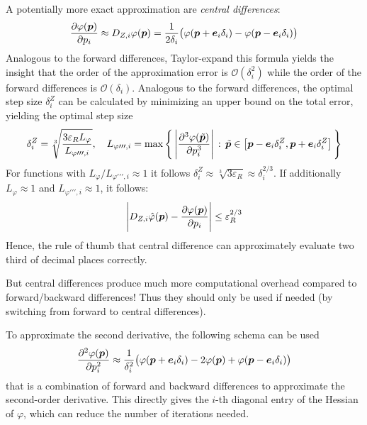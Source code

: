 			A potentially more exact approximation are \emph{central differences}:
			\begin{align*}
				\pdv{\varphi(\bm{p})}{p_i} \approx D_{Z, i}\varphi(\bm{p}) = \frac{1}{2 \delta_i} \big( \varphi(\bm{p} + \bm{e}_i \delta_i) - \varphi(\bm{p} - \bm{e}_i \delta_i) \big)
			\end{align*}
			Analogous to the forward differences, Taylor-expand this formula yields the insight that the order of the approximation error is \( \mathcal{O}(\delta_i^2) \) while the order of the forward differences is \( \mathcal{O}(\delta_i) \). Analogous to the forward differences, the optimal step size \( \delta_i^Z \) can be calculated by minimizing an upper bound on the total error, yielding the optimal step size
			\begin{align*}
				\delta_i^Z = \sqrt[3]{\frac{3 \varepsilon_R L_\varphi}{L_{\varphi\prime\prime\prime, i}}},\quad L_{\varphi\prime\prime\prime, i} = \max\Bigg\{\, \Bigg\lvert \pdv[3]{\varphi(\tilde{\bm{p}})}{p_i} \Bigg\rvert \,:\, \tilde{\bm{p}} \in \big[ \bm{p} - \bm{e}_i \delta_i^Z, \bm{p} + \bm{e}_i \delta_i^Z \big] \,\Bigg\}
			\end{align*}
			For functions with \( L_\varphi / L_{\varphi\prime\prime\prime, i} \approx 1 \) it follows \( \delta_i^Z \approx \sqrt[3]{3\varepsilon_R} \approx \delta_i^{2/3} \). If additionally \( L_\varphi \approx 1 \) and \( L_{\varphi\prime\prime\prime, i} \approx 1 \), it follows:
			\begin{align*}
				\Bigg\lvert D_{Z, i}\hat{\varphi}(\bm{p}) - \pdv{\varphi(\bm{p})}{p_i} \Bigg\rvert \leq \varepsilon_R^{2/3}
			\end{align*}
			Hence, the rule of thumb that central difference can approximately evaluate two third of decimal places correctly.

			But central differences produce much more computational overhead compared to forward/backward differences! Thus they should only be used if needed (by switching from forward to central differences).

			To approximate the second derivative, the following schema can be used
			\begin{align*}
				\pdv[2]{\varphi(\bm{p})}{p_i} \approx \frac{1}{\delta_i^2} \big( \varphi(\bm{p} + \bm{e}_i \delta_i) - 2\varphi(\bm{p}) + \varphi(\bm{p} - \bm{e}_i \delta_i) \big)
			\end{align*}
			that is a combination of forward and backward differences to approximate the second-order derivative. This directly gives the \(i\)-th diagonal entry of the Hessian of \(\varphi\), which can reduce the number of iterations needed.

